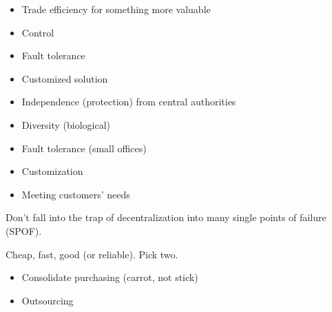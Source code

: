 \documentclass{slides}
\newcommand{\bi}{\begin{itemize}}
\newcommand{\ei}{\end{itemize}}
\begin{document}
\bi
\item Trade efficiency for something more valuable
\item Control
\item Fault tolerance
\item Customized solution
\item Independence (protection) from central authorities
\item Diversity (biological)
\ei


\bi
\item Fault tolerance (small offices)
\item Customization
\item Meeting customers' needs
\ei

Don't fall into the trap of decentralization into many single points
of failure (SPOF).


Cheap, fast, good (or reliable).  Pick two.

\bi
\item Consolidate purchasing (carrot, not stick)
\item Outsourcing
\ei
\end{document}
